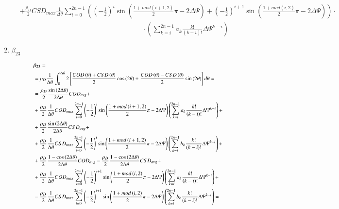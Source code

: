 \documentclass[review]{elsarticle}
\begin{document}
\begin{enumerate}
\begin{equation}
\begin{aligned}
&+\frac{\rho_{D}}{2}CSD_{max}\frac{1}{\Delta\theta}\sum_{i=0}^{2n-1}\left(\left(-\frac{1}{2}\right)^{i}\sin\left(\frac{1+mod\left(i+1,2\right)}{2}\pi-2\Delta\Psi\right)+\left(-\frac{1}{2}\right)^{i+1}\sin\left(\frac{1+mod\left(i,2\right)}{2}\pi-2\Delta\Psi\right)\right)\cdot\\&\qquad\qquad\qquad\qquad\qquad\qquad\qquad\qquad\qquad\cdot\left(\sum_{k=i}^{2n-1}a_{k}\frac{k!}{\left(k-i\right)!}\Delta\Psi^{k-i}\right)
\end{aligned}
\end{equation}

\item $\beta_{23}$

\begin{equation}
\footnotesize
\begin{aligned}
&\beta_{23}=\\
&=\rho_{D}\frac{1}{\Delta\theta}\int_{0}^{\Delta\theta}2\left[\frac{COD\left(\theta\right)+CSD\left(\theta\right)}{2}\cos\left(2\theta\right)+\frac{COD\left(\theta\right)-CSD\left(\theta\right)}{2}\sin\left(2\theta\right)\right]d\theta=\\
&=\frac{\rho_{D}}{2}\frac{\sin\left(2\Delta\theta\right)}{2\Delta\theta}COD_{avg}+\\
&+\frac{\rho_{D}}{2}\frac{1}{\Delta\theta}COD_{max}\sum_{i=0}^{2n-1}\left(-\frac{1}{2}\right)^{i}\sin\left(\frac{1+mod\left(i+1,2\right)}{2}\pi-2\Delta\Psi\right)\left(\sum_{k=i}^{2n-1}a_{k}\frac{k!}{\left(k-i\right)!}\Delta\Psi^{k-i}\right)+\\
&+\frac{\rho_{D}}{2}\frac{\sin\left(2\Delta\theta\right)}{2\Delta\theta}CSD_{avg}+\\
&+\frac{\rho_{D}}{2}\frac{1}{\Delta\theta}CSD_{max}\sum_{i=0}^{2n-1}\left(-\frac{1}{2}\right)^{i}\sin\left(\frac{1+mod\left(i+1,2\right)}{2}\pi-2\Delta\Psi\right)\left(\sum_{k=i}^{2n-1}b_{k}\frac{k!}{\left(k-i\right)!}\Delta\Psi^{k-i}\right)+\\
&+\frac{\rho_{D}}{2}\frac{1-\cos\left(2\Delta\theta\right)}{2\Delta\theta}COD_{avg}-\frac{\rho_{D}}{2}\frac{1-\cos\left(2\Delta\theta\right)}{2\Delta\theta}CSD_{avg}+\\
&+\frac{\rho_{D}}{2}\frac{1}{\Delta\theta}COD_{max}\sum_{i=0}^{2n-1}\left(-\frac{1}{2}\right)^{i+1}\sin\left(\frac{1+mod\left(i,2\right)}{2}\pi-2\Delta\Psi\right)\left(\sum_{k=i}^{2n-1}a_{k}\frac{k!}{\left(k-i\right)!}\Delta\Psi^{k-i}\right)+\\
&-\frac{\rho_{D}}{2}\frac{1}{\Delta\theta}CSD_{max}\sum_{i=0}^{2n-1}\left(-\frac{1}{2}\right)^{i+1}\sin\left(\frac{1+mod\left(i,2\right)}{2}\pi-2\Delta\Psi\right)\left(\sum_{k=i}^{2n-1}b_{k}\frac{k!}{\left(k-i\right)!}\Delta\Psi^{k-i}\right)=\\

\end{aligned}
\end{equation}
\end{enumerate}
\end{document}
